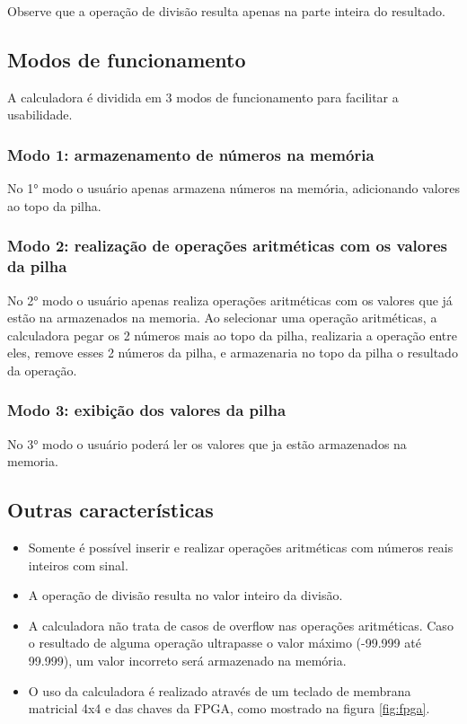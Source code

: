 \documentclass[12pt, a4paper]{article}
\begin{document}
	Observe que a operação de divisão resulta apenas na parte inteira do resultado.
	
	\subsection{Modos de funcionamento}
	
	A calculadora é dividida em 3 modos de funcionamento para facilitar a usabilidade.
	
	\subsubsection*{Modo 1: armazenamento de números na memória}
	No 1° modo o usuário apenas armazena números na memória, adicionando valores ao topo da pilha.
	
	\subsubsection*{Modo 2: realização de operações aritméticas com os valores da pilha}
	No 2° modo o usuário apenas realiza operações aritméticas com os valores que já estão na armazenados na memoria. Ao selecionar 
	uma operação aritméticas, a calculadora pegar os 2 números mais ao topo da pilha, realizaria a operação entre eles, remove esses 2 números da 
	pilha, e armazenaria no topo da pilha o resultado da operação.
	
	\subsubsection*{Modo 3: exibição dos valores da pilha}
	No 3° modo o usuário poderá ler os valores que ja estão armazenados na memoria.
	
	\subsection{Outras características}
	
	\begin{itemize}
		\item Somente é possível inserir e realizar operações aritméticas com números reais inteiros com sinal.
		
		\item A operação de divisão resulta no valor inteiro da divisão.
		
		\item A calculadora não trata de casos de overflow nas operações aritméticas. Caso o resultado de alguma operação ultrapasse o valor máximo (-99.999 até 99.999),
		um valor incorreto será armazenado na memória.
		
		\item O uso da calculadora é realizado através de um teclado de membrana matricial 4x4 e das chaves da FPGA, como mostrado na figura \ref{fig:fpga}.
	\end{itemize}
	
\end{document}
